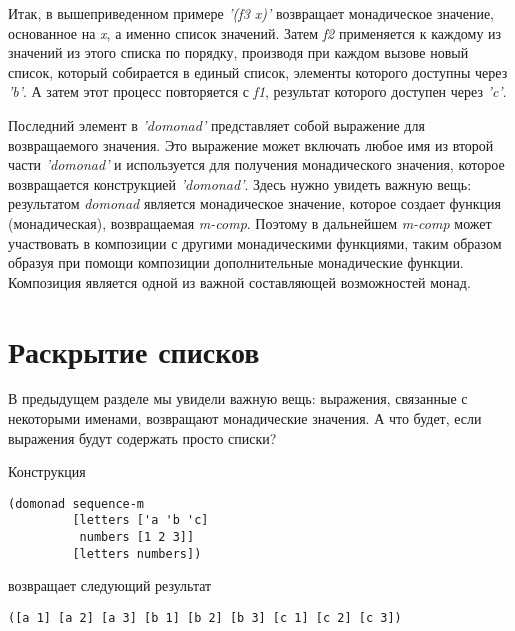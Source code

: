 \documentclass[a4paper,12pt]{article}
\newcommand{\cl}[1] {{\it #1}}
\begin{document}
Итак, в вышеприведенном примере \cl{'(f3 x)'} возвращает монадическое значение, основанное на \cl{x}, а именно
список значений. Затем \cl{f2} применяется к каждому из значений из этого списка по порядку, производя при 
каждом вызове новый список, который собирается в единый список,
элементы которого доступны через \cl{'b'}. А затем этот процесс повторяется с \cl{f1}, 
результат которого доступен через \cl{'c'}. 

Последний элемент в \cl{'domonad'} представляет собой выражение для возвращаемого значения. Это
выражение может включать любое имя из второй части \cl{'domonad'} и используется для
получения монадического значения, которое возвращается конструкцией \cl{'domonad'}. Здесь нужно увидеть
важную вещь: результатом \cl{domonad} является монадическое значение, которое создает функция (монадическая), возвращаемая
\cl{m-comp}. Поэтому в дальнейшем \cl{m-comp} может участвовать в композиции с 
другими монадическими функциями, таким образом образуя при помощи композиции дополнительные монадические функции. 
Композиция является одной из важной составляющей возможностей монад.


\section{Раскрытие списков}\label{comp-on}
В предыдущем разделе мы увидели важную вещь: выражения, связанные с некоторыми именами, возвращают
монадические значения. А что будет, если выражения будут содержать просто списки?

Конструкция 

\begin{verbatim}
(domonad sequence-m
         [letters ['a 'b 'c]
          numbers [1 2 3]]
         [letters numbers])
\end{verbatim}
возвращает следующий результат
\begin{verbatim}
([a 1] [a 2] [a 3] [b 1] [b 2] [b 3] [c 1] [c 2] [c 3])
\end{verbatim}
\end{document}
